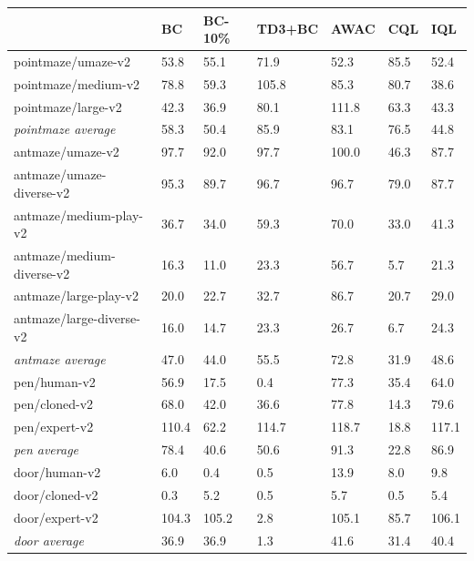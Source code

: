 \documentclass{article}
\begin{document}
\begin{table}[]
\footnotesize
\centering
\begin{tabular}{@{}lllllll@{}}
\toprule
                             & BC    & BC-10\% & TD3+BC & AWAC  & CQL   & IQL   \\ \midrule
pointmaze/umaze-v2           & 53.8  & 55.1    & 71.9   & 52.3  & 85.5  & 52.4  \\
pointmaze/medium-v2          & 78.8  & 59.3    & 105.8  & 85.3  & 80.7  & 38.6  \\
pointmaze/large-v2           & 42.3  & 36.9    & 80.1   & 111.8 & 63.3  & 43.3  \\ \midrule
\textit{pointmaze average}   & 58.3  & 50.4    & 85.9   & 83.1  & 76.5  & 44.8  \\ \midrule
antmaze/umaze-v2             & 97.7  & 92.0    & 97.7   & 100.0 & 46.3  & 87.7  \\
antmaze/umaze-diverse-v2     & 95.3  & 89.7    & 96.7   & 96.7  & 79.0  & 87.7  \\
antmaze/medium-play-v2       & 36.7  & 34.0    & 59.3   & 70.0  & 33.0  & 41.3  \\
antmaze/medium-diverse-v2    & 16.3  & 11.0    & 23.3   & 56.7  & 5.7   & 21.3  \\
antmaze/large-play-v2        & 20.0  & 22.7    & 32.7   & 86.7  & 20.7  & 29.0  \\
antmaze/large-diverse-v2     & 16.0  & 14.7    & 23.3   & 26.7  & 6.7   & 24.3  \\ \midrule
\textit{antmaze average}     & 47.0  & 44.0    & 55.5   & 72.8  & 31.9  & 48.6  \\ \midrule
pen/human-v2                 & 56.9  & 17.5    & 0.4    & 77.3  & 35.4  & 64.0  \\
pen/cloned-v2                & 68.0  & 42.0    & 36.6   & 77.8  & 14.3  & 79.6  \\
pen/expert-v2                & 110.4 & 62.2    & 114.7  & 118.7 & 18.8  & 117.1 \\ \midrule
\textit{pen average}         & 78.4  & 40.6    & 50.6   & 91.3  & 22.8  & 86.9  \\ \midrule
door/human-v2                & 6.0   & 0.4     & 0.5    & 13.9  & 8.0   & 9.8   \\
door/cloned-v2               & 0.3   & 5.2     & 0.5    & 5.7   & 0.5   & 5.4   \\
door/expert-v2               & 104.3 & 105.2   & 2.8    & 105.1 & 85.7  & 106.1 \\ \midrule
\textit{door average}        & 36.9  & 36.9    & 1.3    & 41.6  & 31.4  & 40.4  \\ \midrule

\end{tabular}
\end{table}
\end{document}
